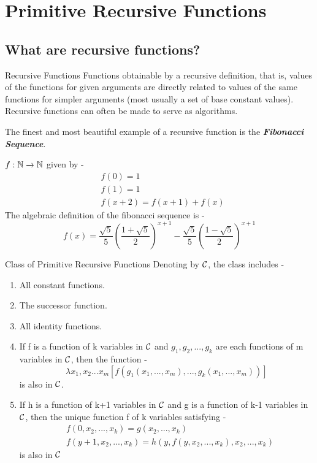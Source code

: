 \documentclass[openany]{book}
\begin{document}
\section{Primitive Recursive Functions}
\subsection{What are recursive functions?}
\begin{mydefinition}{Recursive Functions}
Functions obtainable by a recursive definition, that is, values of the functions for given arguments are directly related to values of the same functions for simpler arguments (most usually a set of base constant values). 
Recursive functions can often be made to serve as algorithms. 
\end{mydefinition}
The finest and most beautiful example of a recursive function is the \textbf{\textit{Fibonacci Sequence}}. \\
\begin{example}
$f: \mathbb{N} \xrightarrow{} \mathbb{N}$ given by - 
    \begin{align*}
        &f(0) = 1 \\
        &f(1) = 1 \\
        &f(x+2) = f(x+1) + f(x)
    \end{align*}
The algebraic definition of the fibonacci sequence is - 
$$f(x) = \frac{\sqrt{5}}{5}\left({\frac{1+\sqrt{5}}{2}}\right)^{x+1} - \frac{\sqrt{5}}{5}\left({\frac{1-\sqrt{5}}{2}}\right)^{x+1}$$
\end{example}
\begin{mydefinition}{Class of Primitive Recursive Functions}
Denoting by $\mathcal{C}$, the class includes - 
\begin{enumerate}
    \item All constant functions.
    \item The successor function.
    \item All identity functions. 
    \item If f is a function of k variables in $\mathcal{C}$ and $g_1, g_2, ..., g_k$ are each functions of m variables in $\mathcal{C}$, then the function - 
    $$\lambda x_{1}, x_{2}...x_{m}[f(g_{1}(x_{1}, ..., x_{m}), ..., g_{k}(x_1, ..., x_{m}))]$$ is also in $\mathcal{C}$.
    \item If h is a function of k+1 variables in $\mathcal{C}$ and g is a function of k-1 variables in $\mathcal{C}$, then the unique function f of k variables satisfying - 
    \begin{align*}
        &f(0, x_2, ..., x_k) = g(x_2, ..., x_k) \\ 
        &f(y+1, x_2, ..., x_k) = h(y, f(y, x_2, ..., x_k), x_2, ..., x_k)
    \end{align*}
    is also in $\mathcal{C}$
\end{enumerate}
\end{mydefinition}
\end{document}
